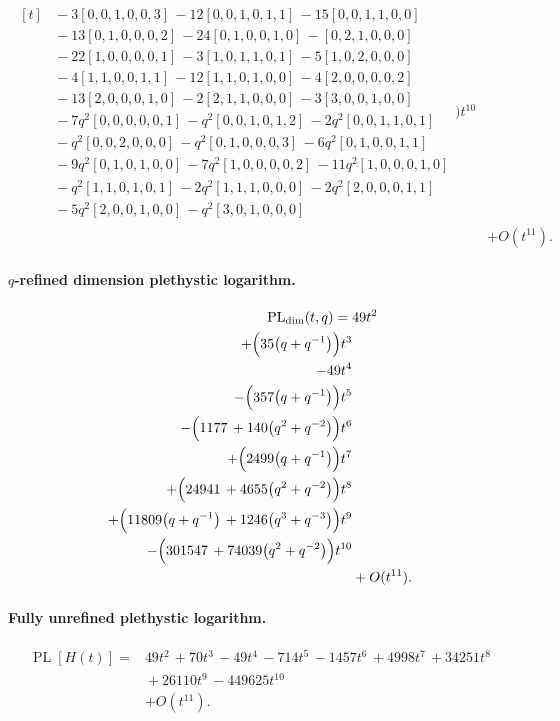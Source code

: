 \documentclass[10pt]{article}
\begin{document}
\[\begin{aligned}
\begin{aligned}[t]
  &{}-3[0,0,1,0,0,3]\,-12[0,0,1,0,1,1]\,-15[0,0,1,1,0,0] \\
  &{}-13[0,1,0,0,0,2]\,-24[0,1,0,0,1,0]\,-[0,2,1,0,0,0] \\
  &{}-22[1,0,0,0,0,1]\,-3[1,0,1,1,0,1]\,-5[1,0,2,0,0,0] \\
  &{}-4[1,1,0,0,1,1]\,-12[1,1,0,1,0,0]\,-4[2,0,0,0,0,2] \\
  &{}-13[2,0,0,0,1,0]\,-2[2,1,1,0,0,0]\,-3[3,0,0,1,0,0] \\
  &{}-7q^{2}[0,0,0,0,0,1]\,-q^{2}[0,0,1,0,1,2]\,-2q^{2}[0,0,1,1,0,1] \\
  &{}-q^{2}[0,0,2,0,0,0]\,-q^{2}[0,1,0,0,0,3]\,-6q^{2}[0,1,0,0,1,1] \\
  &{}-9q^{2}[0,1,0,1,0,0]\,-7q^{2}[1,0,0,0,0,2]\,-11q^{2}[1,0,0,0,1,0] \\
  &{}-q^{2}[1,1,0,1,0,1]\,-2q^{2}[1,1,1,0,0,0]\,-2q^{2}[2,0,0,0,1,1] \\
  &{}-5q^{2}[2,0,0,1,0,0]\,-q^{2}[3,0,1,0,0,0]\end{aligned}\Bigr)t^{10} \\
  &+ O(t^{11}).
\end{aligned}
\]
\paragraph{$q$-refined dimension plethystic logarithm.}
\[
\begin{aligned}
\operatorname{PL}_{\mathrm{dim}}(t,q) ={}&
   49t^{2} \\
  + \Bigl(35\bigl(q+q^{-1}\bigr)\Bigr)t^{3} \\
  -49t^{4} \\
  -\Bigl(357\bigl(q+q^{-1}\bigr)\Bigr)t^{5} \\
  -\Bigl(1177\,+140\bigl(q^{2}+q^{-2}\bigr)\Bigr)t^{6} \\
  + \Bigl(2499\bigl(q+q^{-1}\bigr)\Bigr)t^{7} \\
  + \Bigl(24941\,+4655\bigl(q^{2}+q^{-2}\bigr)\Bigr)t^{8} \\
  + \Bigl(11809\bigl(q+q^{-1}\bigr)\,+1246\bigl(q^{3}+q^{-3}\bigr)\Bigr)t^{9} \\
  -\Bigl(301547\,+74039\bigl(q^{2}+q^{-2}\bigr)\Bigr)t^{10} \\
  &+ O(t^{11}).
\end{aligned}
\]
\paragraph{Fully unrefined plethystic logarithm.}
\[
\begin{aligned}
\operatorname{PL}[H(t)] ={}& 49t^{2}\,+70t^{3}\,-49t^{4}\,-714t^{5}\,-1457t^{6}\,+4998t^{7}\,+34251t^{8} \\
  &{}+26110t^{9}\,-449625t^{10} \\
  &+ O(t^{11}).
\end{aligned}
\]
\end{document}
